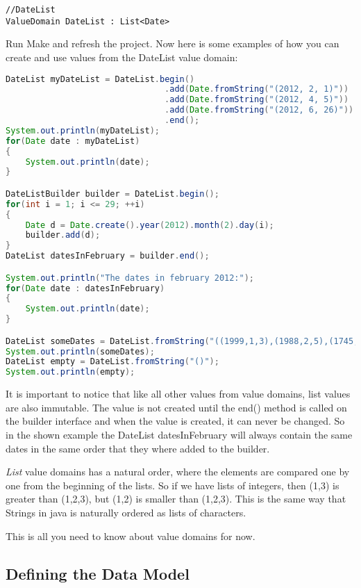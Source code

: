 \begin{lstlisting}[basicstyle={\scriptsize}]
//DateList
ValueDomain DateList : List<Date>
\end{lstlisting}


Run Make and refresh the project. Now here is some examples of how
you can create and use values from the DateList value domain:

\begin{lstlisting}[basicstyle={\scriptsize},language=Java,tabsize=2]
DateList myDateList = DateList.begin()
								.add(Date.fromString("(2012, 2, 1)"))
								.add(Date.fromString("(2012, 4, 5)"))
								.add(Date.fromString("(2012, 6, 26)"))
								.end();
System.out.println(myDateList);		
for(Date date : myDateList)
{
	System.out.println(date);
}

DateListBuilder builder = DateList.begin();
for(int i = 1; i <= 29; ++i)
{
	Date d = Date.create().year(2012).month(2).day(i);
	builder.add(d);
}
DateList datesInFebruary = builder.end();

System.out.println("The dates in february 2012:");
for(Date date : datesInFebruary)
{
	System.out.println(date);
}

DateList someDates = DateList.fromString("((1999,1,3),(1988,2,5),(1745,3,4))");
System.out.println(someDates);
DateList empty = DateList.fromString("()");
System.out.println(empty);
\end{lstlisting}


It is important to notice that like all other values from value domains,
list values are also immutable. The value is not created until the
end() method is called on the builder interface and when the value
is created, it can never be changed. So in the shown example the DateList
datesInFebruary will always contain the same dates in the same order
that they where added to the builder.

\emph{List} value domains has a natural order, where the elements
are compared one by one from the beginning of the lists. So if we
have lists of integers, then (1,3) is greater than (1,2,3), but (1,2)
is smaller than (1,2,3). This is the same way that Strings in java
is naturally ordered as lists of characters. 

This is all you need to know about value domains for now. 


\subsection{Defining the Data Model}

